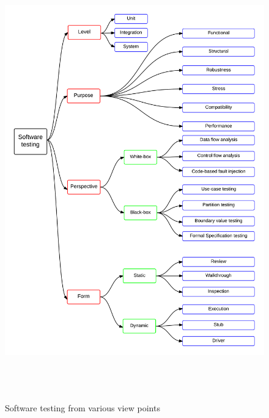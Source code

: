 \begin{figure}[H]
	\centering
	\centerline{\includegraphics[width=16cm, height=19cm]{chapter2/softwareTestingFlow.png}}
	\caption{Software testing from various view points}
	\label{fig:softwareTestingFlow_2}
\end{figure}

